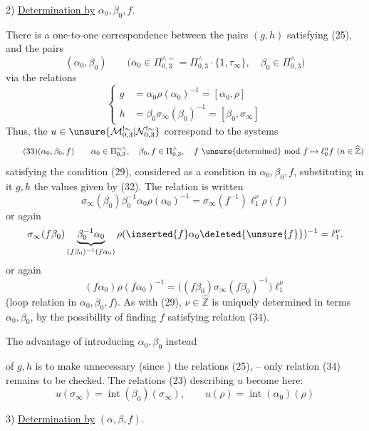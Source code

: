
2) \uline{Determination by} $\alpha_0,\beta_0,f$.

There is a one-to-one correspondence between the pairs $(g,h)$ satisfying (25), and the pairs
\[
\tag{31}
(\alpha_0,\beta_0)\qquad
\bigl(\alpha_0\in\Pi_{0,3}^{\wedge\sim}=\Pi_{0,3}^{\wedge}\cdot\{1,\tau_\infty\},\quad
\beta_0\in\Pi_{0,3}^{\wedge}\bigr)
\]
 via the relations
\[
\tag{32}
\left\{\begin{aligned}
g&=\alpha_0\rho(\alpha_0)^{-1}=[\alpha_0,\rho]\\
h&=\beta_0\sigma_\infty(\beta_0)^{-1}=[\beta_0,\sigma_\infty]
\end{aligned}\right.
\]
Thus, the $u\in\unsure{\mathcal{M}_{0,3}^{!\sim}|\mathcal{N}_{0,3}^{!\sim}}$ correspond to the systems
\[
\tag{33}
(\alpha_0,\beta_0,f)\qquad
\alpha_0\in\Pi_{0,3}^{\sim\wedge},\quad\beta_0,f\in\Pi_{0,3}^{\wedge},\quad
f\ \text{\unsure{determined} mod }f\mapsto\ell_0^n f\ (n\in\widehat{\mathbb Z})
\]
satisfying the condition  (29), considered as a condition in $\alpha_0,\beta_0,f$,  substituting in it  $g,h$ the values given by (32). The relation is written
\[
\sigma_\infty(\beta_0)\beta_0^{-1}\alpha_0\rho(\alpha_0)^{-1}
=\sigma_\infty(f^{-1})\ell_1^\nu\rho(f)
\]
or again
\[
\sigma_\infty(f\beta_0)
\underbrace{\beta_0^{-1}\alpha_0}_{(f\beta_0)^{-1}(f\alpha_0)}
\rho(\inserted{f}\alpha_0\deleted{\unsure{f}})^{-1}
=\ell_1^\nu.
\]
or again
\[
\tag{34}
\boxed{(f\alpha_0)\rho(f\alpha_0)^{-1}
=\bigl((f\beta_0)\sigma_\infty(f\beta_0)^{-1}\bigr)\ell_1^\nu}
\]
(loop relation in $\alpha_0,\beta_0,f$). As with (29), $\nu\in\widehat{\mathbb Z}$ is uniquely determined in terms  $\alpha_0,\beta_0$, by the possibility of finding $f$ satisfying relation (34).

The advantage of introducing $\alpha_0,\beta_0$ instead


of $g,h$ is to make unnecessary (since ) the relations (25), -- only relation (34) remains to be checked. The relations (23) describing $u$ become here:
\[
\tag{35}
u(\sigma_\infty)=\operatorname{int}(\beta_0)(\sigma_\infty),\qquad
u(\rho)=\operatorname{int}(\alpha_0)(\rho)
\]

3) \uline{Determination by} $(\alpha,\beta,f)$.

